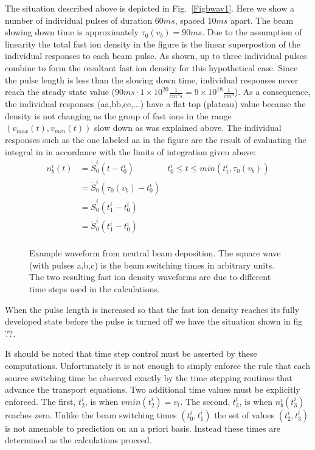 The situation described above is depicted in
Fig.~\ref{Figbwav1}. Here we show a number of individual
pulses
of duration 60$ms$, spaced 10$ms$ apart. The beam slowing
down time is approximately $\tau_0(v_b) = 90 ms $. Due to the assumption
of linearity the total fast ion density in the figure is the
linear superpostion of the individual responses to each beam
pulse. As shown, up to three individual pulses combine to form
the resultant fast ion density for this hypothetical
case. Since the pulse length is less than the slowing down
time, individual responses  never reach the
steady state value  ($ 90 ms \cdot 1\times 10^{20}
\frac{1}{cm^3s} = 9\times 10^{18}\frac{1}{cm^3}$).  As a consequence, the individual responses
(aa,bb,cc,...) have a flat top (plateau)  value because the
density is not changing as the group of fast ions in the range
$(v_{max}(t),v_{min}(t)) $ slow down as was explained above. The
individual responses such as the one labeled aa in the figure
are the result of evaluating the integral in
 in accordance with the limits of
integration given above:
\begin{align}
 n_b^i(t) &= \dot S_0^i(t-t_0^i) & t_0^i \le t \le
 min(t_1^i,\tau_0(v_b)) \\
 & =  \dot S_0^i  (\tau_0(v_b) - t_0^i) &  \\
 & =  \dot S_0^i (t_1^i -  t_0^i)  &  \\
 & =  \dot S_0^i (t_1^i -  t_0^i) & \\
\end{align}

\begin{figure}[hbt] %
 \centering
 \mbox{}
 \caption{Example waveform from neutral beam deposition. The square wave (with
 pulses a,b,c)  is the beam switching times in arbitrary units. The two
 resulting fast ion density waveforms are due to different time steps used in
 the calculations.}
 \label{Figbwav2}
\end{figure}

When the pulse length is increased so that the fast ion density reaches its
fully developed state before the pulse is turned off we have the situation shown
in fig ??.

It should be noted that time step control must be asserted by these
computations. Unfortunately it is not enough to simply enforce the rule that
each source switching time be observed exactly by the time stepping routines
that advance the transport equations. Two additional time values must be
explicitly enforced. The first, $ t_2^i $, is when $vmin(t_2^i) = v_t$. The
second, $t_3^i$, is when $n_b^i(t_3^i) $ reaches zero. Unlike the beam switching
times  $(t_0^i,t_1^i) $ the set of values $( t_2^i,t_3^i)$ is not amenable to
prediction on an a priori basis. Instead these times are determined as the
calculations proceed.

